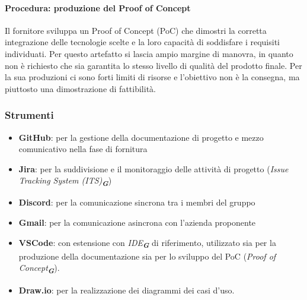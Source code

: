 \documentclass[a4paper,12pt]{article}
\newcommand{\glossario}[1]{\textit{#1}\textsubscript{\textbf{\textit{\textcolor{lightblack}{G}}}}}
\begin{document}
\paragraph{Procedura: produzione del Proof of Concept}
Il fornitore sviluppa un Proof of Concept (PoC) che dimostri la corretta integrazione delle tecnologie scelte e la loro capacità di soddisfare i requisiti individuati.
Per questo artefatto si lascia ampio margine di manovra, in quanto non è richiesto che sia garantita lo stesso livello di qualità del prodotto finale. Per la sua produzioni ci sono forti limiti di risorse e l'obiettivo non è la consegna, ma piuttosto una dimostrazione di fattibilità.

\subsubsection{Strumenti}
\begin{itemize}
    \item \textbf{GitHub}: per la gestione della documentazione di progetto e mezzo comunicativo
          nella fase di fornitura
    \item \textbf{Jira}: per la suddivisione e il monitoraggio delle attività di progetto
          (\glossario{Issue Tracking System (ITS)})
    \item \textbf{Discord}: per la comunicazione sincrona tra i membri del gruppo
    \item \textbf{Gmail}: per la comunicazione asincrona con l'azienda proponente
    \item \textbf{VSCode}: con estensione con \glossario{IDE} di riferimento, utilizzato sia per la
          produzione della documentazione sia per lo sviluppo del PoC (\glossario{Proof
              of Concept}).
    \item \textbf{Draw.io}: per la realizzazione dei diagrammi dei casi d'uso.
\end{itemize}
\end{document}
